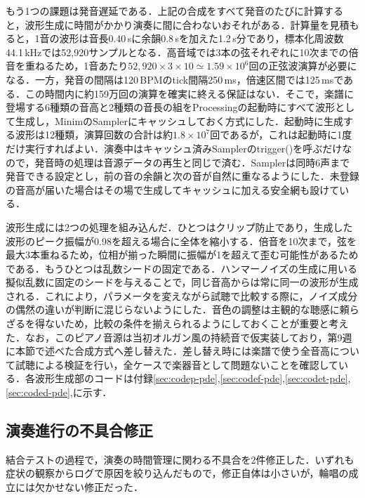 \documentclass[uplatex,dvipdfmx]{jlreq}
\begin{document}
もう1つの課題は発音遅延である．上記の合成をすべて発音のたびに計算すると，波形生成に時間がかかり演奏に間に合わないおそれがある．計算量を見積もると，1音の波形は音長0.40\,sに余韻0.8\,sを加えた1.2\,s分であり，標本化周波数44.1\,kHzでは52{,}920サンプルとなる．高音域では3本の弦それぞれに10次までの倍音を重ねるため，1音あたり$52{,}920 \times 3 \times 10 \simeq 1.59 \times 10^{6}$回の正弦波演算が必要になる．一方，発音の間隔は120\,BPMのtick間隔250\,ms，倍速区間では125\,msである．この時間内に約159万回の演算を確実に終える保証はない．そこで，楽譜に登場する6種類の音高と2種類の音長の組をProcessingの起動時にすべて波形として生成し，MinimのSamplerにキャッシュしておく方式にした．起動時に生成する波形は12種類，演算回数の合計は約$1.8 \times 10^{7}$回であるが，これは起動時に1度だけ実行すればよい．演奏中はキャッシュ済みSamplerのtrigger()を呼ぶだけなので，発音時の処理は音源データの再生と同じで済む．Samplerは同時6声まで発音できる設定とし，前の音の余韻と次の音が自然に重なるようにした．未登録の音高が届いた場合はその場で生成してキャッシュに加える安全網も設けている．

波形生成には2つの処理を組み込んだ．ひとつはクリップ防止であり，生成した波形のピーク振幅が0.98を超える場合に全体を縮小する．倍音を10次まで，弦を最大3本重ねるため，位相が揃った瞬間に振幅が1を超えて歪む可能性があるためである．もうひとつは乱数シードの固定である．ハンマーノイズの生成に用いる擬似乱数に固定のシードを与えることで，同じ音高からは常に同一の波形が生成される．これにより，パラメータを変えながら試聴で比較する際に，ノイズ成分の偶然の違いが判断に混じらないようにした．音色の調整は主観的な聴感に頼らざるを得ないため，比較の条件を揃えられるようにしておくことが重要と考えた．なお，このピアノ音源は当初オルガン風の持続音で仮実装しており，第9週に本節で述べた合成方式へ差し替えた．差し替え時には楽譜で使う全音高について試聴による検証を行い，全ケースで楽器音として問題ないことを確認している．各波形生成部のコードは付録\ref{sec:codep-pde},\ref{sec:codef-pde},\ref{sec:codet-pde},\ref{sec:coded-pde},に示す．

\subsection{演奏進行の不具合修正}
\label{sec:bugfix}

結合テストの過程で，演奏の時間管理に関わる不具合を2件修正した．いずれも症状の観察からログで原因を絞り込んだもので，修正自体は小さいが，輪唱の成立には欠かせない修正だった．
\end{document}
